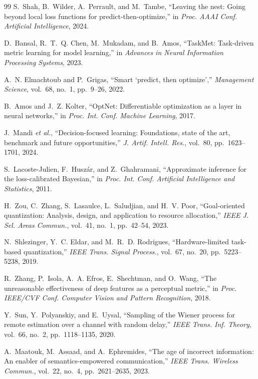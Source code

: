 \documentclass[letterpaper,onecolumn]{IEEEtran}
\theoremstyle{definition}
\theoremstyle{remark}
\begin{document}
\begin{thebibliography}{99}
 S.~Shah, B.~Wilder, A.~Perrault, and M.~Tambe, ``Leaving
the nest: Going beyond local loss functions for predict-then-optimize,'' in
\emph{Proc. AAAI Conf. Artificial Intelligence}, 2024.

 D.~Bansal, R.~T.~Q. Chen, M.~Mukadam, and B.~Amos,
``TaskMet: Task-driven metric learning for model learning,'' in \emph{Advances
in Neural Information Processing Systems}, 2023.

 A.~N. Elmachtoub and P.~Grigas, ``Smart `predict,
then optimize','' \emph{Management Science}, vol.~68, no.~1, pp.~9--26, 2022.

 B.~Amos and J.~Z. Kolter, ``OptNet: Differentiable
optimization as a layer in neural networks,'' in \emph{Proc. Int. Conf.
Machine Learning}, 2017.

 J.~Mandi \emph{et al.}, ``Decision-focused learning:
Foundations, state of the art, benchmark and future opportunities,'' \emph{J.
Artif. Intell. Res.}, vol.~80, pp.~1623--1701, 2024.

 S.~Lacoste-Julien, F.~Husz\'ar, and
Z.~Ghahramani, ``Approximate inference for the loss-calibrated Bayesian,'' in
\emph{Proc. Int. Conf. Artificial Intelligence and Statistics}, 2011.

 H.~Zou, C.~Zhang, S.~Lasaulce, L.~Saludjian, and H.~V.
Poor, ``Goal-oriented quantization: Analysis, design, and application to
resource allocation,'' \emph{IEEE J. Sel. Areas Commun.}, vol.~41, no.~1,
pp.~42--54, 2023.

 N.~Shlezinger, Y.~C. Eldar, and M.~R.~D. Rodrigues,
``Hardware-limited task-based quantization,'' \emph{IEEE Trans. Signal
Process.}, vol.~67, no.~20, pp.~5223--5238, 2019.

 R.~Zhang, P.~Isola, A.~A. Efros, E.~Shechtman, and
O.~Wang, ``The unreasonable effectiveness of deep features as a perceptual
metric,'' in \emph{Proc. IEEE/CVF Conf. Computer Vision and Pattern
Recognition}, 2018.

 Y.~Sun, Y.~Polyanskiy, and E.~Uysal, ``Sampling of the
Wiener process for remote estimation over a channel with random delay,''
\emph{IEEE Trans. Inf. Theory}, vol.~66, no.~2, pp.~1118--1135, 2020.

 A.~Maatouk, M.~Assaad, and A.~Ephremides, ``The age of
incorrect information: An enabler of semantics-empowered communication,''
\emph{IEEE Trans. Wireless Commun.}, vol.~22, no.~4, pp.~2621--2635, 2023.


\end{thebibliography}
\end{document}
